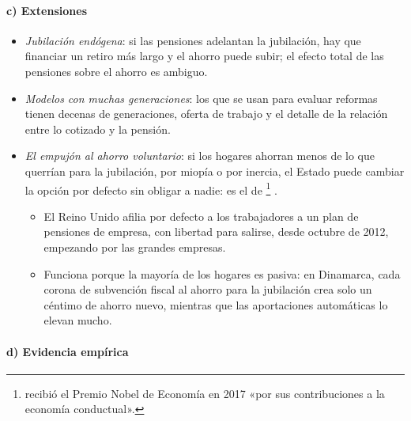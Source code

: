 \documentclass[11pt]{article}
\begin{document}
\paragraph{c) Extensiones}

\begin{itemize}
\item \emph{Jubilación endógena}: si las pensiones adelantan la jubilación, hay que financiar un retiro más largo y el ahorro puede subir; el efecto total de las pensiones sobre el ahorro es ambiguo\nocite{Feldstein1974Social}.
\item \emph{Modelos con muchas generaciones}: los que se usan para evaluar reformas tienen decenas de generaciones, oferta de trabajo y el detalle de la relación entre lo cotizado y la pensión\nocite{AuerbachKotlikoff1987Dynamic}.
\item \emph{El empujón al ahorro voluntario}: si los hogares ahorran menos de lo que querrían para la jubilación, por miopía o por inercia, el Estado puede cambiar la opción por defecto sin obligar a nadie: es el  de \textcite{ThalerSunstein2008Nudge}\footnote{ recibió el Premio Nobel de Economía en 2017 «por sus contribuciones a la economía conductual»\nocite{Nobel2017Thaler}.} .
  \begin{itemize}
  \item El Reino Unido afilia por defecto a los trabajadores a un plan de pensiones de empresa, con libertad para salirse, desde octubre de 2012, empezando por las grandes empresas\nocite{UK2008PensionsAct,UK2010EmployersDuties}.
  \item Funciona porque la mayoría de los hogares es pasiva: en Dinamarca, cada corona de subvención fiscal al ahorro para la jubilación crea solo un céntimo de ahorro nuevo, mientras que las aportaciones automáticas lo elevan mucho\nocite{ChettyEtAl2014Active}.
  \end{itemize}
\end{itemize}

\paragraph{d) Evidencia empírica}
\end{document}
